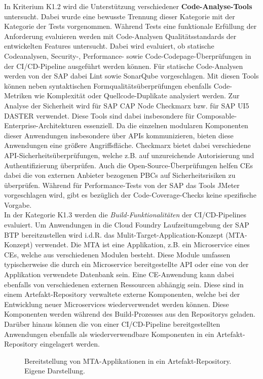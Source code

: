 In Kriterium K1.2 wird die Unterstützung verschiedener \textbf{Code-Analyse-Tools} untersucht. Dabei wurde eine bewusste Trennung dieser Kategorie mit der Kategorie der Tests vorgenommen. Während Tests eine funktionale Erfüllung der Anforderung evaluieren werden mit Code-Analysen Qualitätsstandards der entwickelten Features untersucht. Dabei wird evaluiert, ob statische Codeanalysen, Security-, Performance- sowie Code-Codepage-Überprüfungen in der CI/CD-Pipeline ausgeführt werden können. Für statische Code-Analysen werden von der SAP dabei Lint sowie SonarQube vorgeschlagen. Mit diesen Tools können neben syntaktischen Formqualitätsüberprüfungen ebenfalls Code-Metriken wie Komplexität oder Quellcode-Duplikate analysiert werden. Zur Analyse der Sicherheit wird für SAP CAP Node Checkmarx bzw. für SAP UI5 DASTER verwendet. Diese Tools sind dabei insbesondere für Composable-Enterprise-Architekturen essenziell. Da die einzelnen modularen Komponenten dieser Anwendungen insbesondere über APIs kommunizieren, bieten diese Anwendungen eine größere Angriffsfläche. Checkmarx bietet dabei verschiedene API-Sicherheitsüberprüfungen, welche z.B. auf unzureichende Autorisierung und Authentifizierung überprüfen. Auch die Open-Source-Überprüfungen helfen CEs dabei die von externen Anbieter bezogenen PBCs auf Sicherheitsrisiken zu überprüfen. Während für Performance-Tests von der SAP das Tools JMeter vorgeschlagen wird, gibt es bezüglich der Code-Coverage-Checks keine spezifische Vorgabe.\\
In der Kategorie K1.3 werden die \textit{Build-Funktionalitäten} der CI/CD-Pipelines evaluiert. 
Um Anwendungen in die Cloud Foundry Laufzeitumgebung der SAP BTP bereitzustellen wird i.d.R. das Mulit-Target-Application-Konzept (MTA-Konzept) verwendet. Die MTA ist eine Applikation, z.B. ein Microservice eines CEs, welche aus verschiedenen Modulen besteht. Diese Module umfassen typischerweise die durch ein Microservice bereitgestellte API oder eine von der Applikation verwendete Datenbank sein. Eine CE-Anwendung kann dabei ebenfalls von verschiedenen externen Ressourcen abhängig sein. Diese sind in einem Artefakt-Repository verwaltete externe Komponenten, welche bei der Entwicklung neuer Microservices wiederverwendet werden können. Diese Komponenten werden während des Build-Prozesses aus den Repositorys geladen. Darüber hinaus können die von einer CI/CD-Pipeline bereitgestellten Anwendungen ebenfalls als wiederverwendbare Komponenten in ein Artefakt-Repository eingelagert werden.
\begin{center}
	\begin{figure}[H]
		\centering
		\caption[Bereitstellung von MTA-Applikationen in ein Artefakt-Repository]{Bereitstellung von MTA-Applikationen in ein Artefakt-Repository. Eigene Darstellung.}
		\label{fig:MTA}
	\end{figure}
\end{center}
